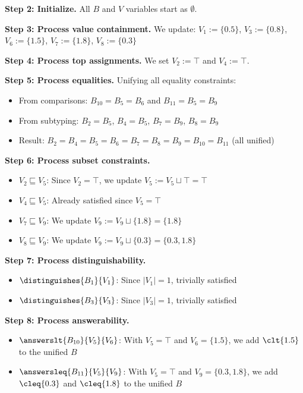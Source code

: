 \begin{example}
    \textbf{Step 2: Initialize.} All $B$ and $V$ variables start as $\emptyset$.

    \textbf{Step 3: Process value containment.} We update:
    $V_1 := \{0.5\}$, $V_3 := \{0.8\}$, $V_6 := \{1.5\}$, $V_7 := \{1.8\}$, $V_8 := \{0.3\}$

    \textbf{Step 4: Process top assignments.} We set $V_2 := \top$ and $V_4 := \top$.

    \textbf{Step 5: Process equalities.} Unifying all equality constraints:
    \begin{itemize}
        \item From comparisons: $B_{10} = B_5 = B_6$ and $B_{11} = B_5 = B_9$
        \item From subtyping: $B_2 = B_5$, $B_4 = B_5$, $B_7 = B_9$, $B_8 = B_9$
        \item Result: $B_2 = B_4 = B_5 = B_6 = B_7 = B_8 = B_9 = B_{10} = B_{11}$ (all unified)
    \end{itemize}

    \textbf{Step 6: Process subset constraints.}
    \begin{itemize}
        \item $V_2 \sqsubseteq V_5$: Since $V_2 = \top$, we update $V_5 := V_5 \sqcup \top = \top$
        \item $V_4 \sqsubseteq V_5$: Already satisfied since $V_5 = \top$
        \item $V_7 \sqsubseteq V_9$: We update $V_9 := V_9 \sqcup \{1.8\} = \{1.8\}$
        \item $V_8 \sqsubseteq V_9$: We update $V_9 := V_9 \sqcup \{0.3\} = \{0.3, 1.8\}$
    \end{itemize}

    \textbf{Step 7: Process distinguishability.}
    \begin{itemize}
        \item $\distinguishes{B_1}{V_1}$: Since $|V_1| = 1$, trivially satisfied
        \item $\distinguishes{B_3}{V_3}$: Since $|V_3| = 1$, trivially satisfied
    \end{itemize}

    \textbf{Step 8: Process answerability.}
    \begin{itemize}
        \item $\answerslt{B_{10}}{V_5}{V_6}$: With $V_5 = \top$ and $V_6 = \{1.5\}$, we add $\clt{1.5}$ to the unified $B$
        \item $\answersleq{B_{11}}{V_5}{V_9}$: With $V_5 = \top$ and $V_9 = \{0.3, 1.8\}$, we add $\cleq{0.3}$ and $\cleq{1.8}$ to the unified $B$
    \end{itemize}


\end{example}
